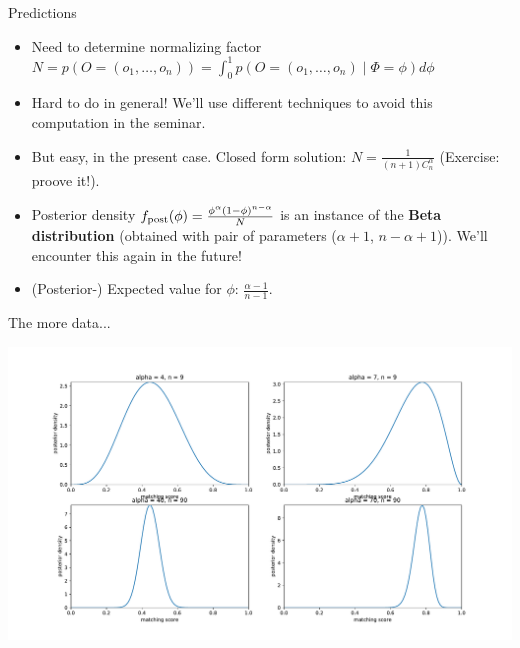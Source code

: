 \documentclass{beamer}
\begin{document}
\begin{frame}{Predictions}
  \begin{itemize}
  \item Need to determine normalizing factor $N = p(O=(o_1, \dots, o_n)) = \int_0^1 p(O=(o_1, \dots, o_n) \mid \Phi = \phi) d\phi$
  \item Hard to do in general! We'll use different techniques to avoid this computation in the seminar.
  \item But easy, in the present case. Closed form solution: $N=\frac{1}{(n+1)C_n^{\alpha}}$ (Exercise: proove it!).
  \item Posterior density $f_{\textnormal{post}}(\phi) = \frac{\phi^{\alpha}(1-\phi)^{n-\alpha}}{N}$ is an instance of the {\bf Beta distribution} (obtained with pair of parameters ($\alpha+1$, $n-\alpha+1$)). We'll encounter this again in the future!
  \item (Posterior-) Expected value for $\phi$: $\frac{\alpha-1}{n-1}$.
  \end{itemize}
\end{frame}

\begin{frame}{The more data...}
  \begin{center}
    \includegraphics[width = \linewidth]{posteriors.pdf}
  \end{center}
\end{frame}
\end{document}
